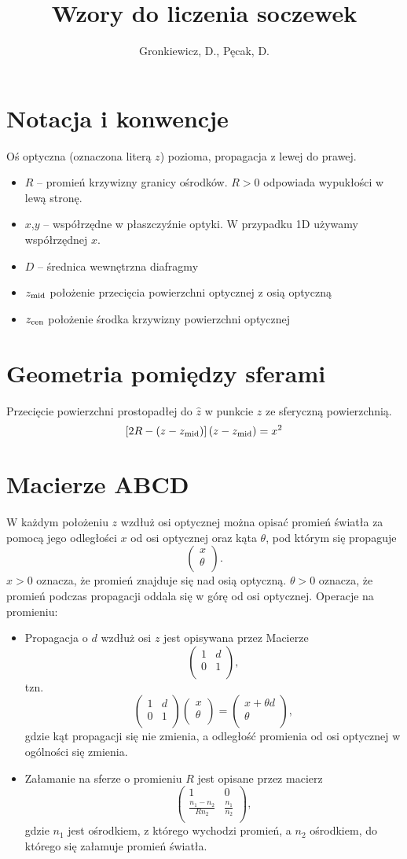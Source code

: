 \documentclass[11pt,a4paper,twocolumn]{article}
\author{Gronkiewicz, D., Pęcak, D.}
\title{Wzory do liczenia soczewek}
\renewcommand{\vector}[2]{\left(
\begin{array}{c}
 #1  \\
 #2  \\
\end{array}
\right)}
\newcommand{\ABCDmat}[4]{\left(
\begin{array}{cc}
 #1 & #2  \\
 #3 & #4  \\
\end{array}
\right)}
\begin{document}
\section{Notacja i konwencje}
Oś optyczna (oznaczona literą $z$) pozioma, propagacja z lewej do prawej.
\begin{itemize}
\item $R$ -- promień krzywizny granicy ośrodków. $R>0$ odpowiada wypukłości w lewą stronę.
\item $x$,$y$ -- współrzędne w płaszczyźnie optyki. W przypadku 1D używamy współrzędnej $x$.
\item $D$ -- średnica wewnętrzna diafragmy
\item $z_{\rm mid}$ położenie przecięcia powierzchni optycznej z osią optyczną
\item $z_{\rm cen}$ położenie środka krzywizny powierzchni optycznej
\end{itemize}

\section{Geometria pomiędzy sferami}

Przecięcie powierzchni prostopadłej do $\hat z$ w punkcie $z$ ze sferyczną powierzchnią.
\begin{equation}
\left[ 2R - ( z - z_{\rm mid} ) \right] \left( z - z_{\rm mid} \right) = x^2
\end{equation}

\section{Macierze ABCD}
W każdym położeniu $z$ wzdłuż osi optycznej można opisać promień światła za pomocą jego odległości $x$ od osi optycznej oraz kąta $\theta$, pod którym się  propaguje
\[
\vector{x}{\theta}.
\]
$x > 0$ oznacza, że promień znajduje się nad osią optyczną. $\theta>0$ oznacza, że promień podczas propagacji oddala się w górę od osi optycznej. 
Operacje na promieniu:
\begin{itemize}
 \item Propagacja o $d$ wzdłuż osi $z$ jest opisywana przez Macierze
 \[
  \ABCDmat{1}{d}{0}{1},
 \]
 tzn. 
 \[
  \ABCDmat{1}{d}{0}{1} \vector{x}{\theta} = \vector{x + \theta d}{\theta},
 \]
 gdzie kąt propagacji się nie zmienia, a odległość promienia od osi optycznej w ogólności się zmienia.
 
 \item Załamanie na sferze o promieniu $R$ jest opisane przez macierz
 \[
  \ABCDmat{1}{0}{\frac{n_1-n_2}{Rn_2}}{\frac{n_1}{n_2}},
 \]
 gdzie $n_1$ jest ośrodkiem, z którego wychodzi promień, a $n_2$ ośrodkiem, do którego się załamuje promień światła.

\end{itemize}
\end{document}
